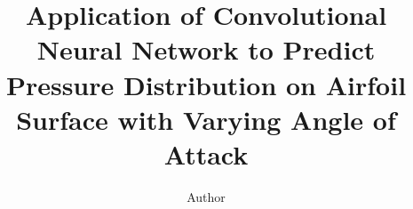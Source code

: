 \title{Application of Convolutional Neural Network to Predict Pressure Distribution on Airfoil Surface with Varying Angle of Attack}
\author{Author}
